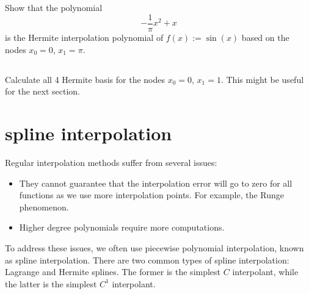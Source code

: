 \documentclass{article}%
\begin{document}
\subsection{}
Show that the polynomial
$$ -\frac{1}{\pi}x^2 + x$$ 
is the Hermite interpolation polynomial of $f(x):=\sin(x)$ based on the nodes $x_0=0$, $x_1=\pi$.
  
\subsection{}
Calculate all 4 Hermite basis for the nodes $x_0=0$, $x_1=1$. This might be useful for the next section.


\section{spline interpolation}
Regular interpolation methods suffer from several issues:
\begin{itemize}
  \item They cannot guarantee that the interpolation error will go to zero for all functions as we use more interpolation points. For example, the Runge phenomenon.
  \item Higher degree polynomials require more computations.
\end{itemize}

To address these issues, we often use piecewise polynomial interpolation, known as spline interpolation. There are two common types of spline interpolation: Lagrange and Hermite splines. The former is the simplest $C$ interpolant, while the latter is the simplest $C^1$ interpolant.
\end{document}
